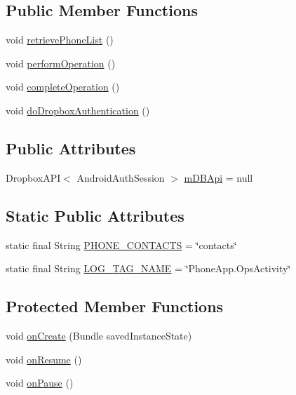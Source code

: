 \subsection*{Public Member Functions}
\begin{DoxyCompactItemize}
\item 
void \hyperlink{classcourse_1_1examples_1_1phoneapp_1_1_ops_activity_a4483070d81483a14c450c03a23521b33}{retrieve\+Phone\+List} ()
\item 
void \hyperlink{classcourse_1_1examples_1_1phoneapp_1_1_ops_activity_a427848e2c42eb538b888f8b7214b8cd4}{perform\+Operation} ()
\item 
void \hyperlink{classcourse_1_1examples_1_1phoneapp_1_1_ops_activity_abb7503626eea4caf6ffba416b13bd788}{complete\+Operation} ()
\item 
void \hyperlink{classcourse_1_1examples_1_1phoneapp_1_1_ops_activity_ae6f21dd987eba779e66e4bb66bbee391}{do\+Dropbox\+Authentication} ()
\end{DoxyCompactItemize}
\subsection*{Public Attributes}
\begin{DoxyCompactItemize}
\item 
Dropbox\+A\+P\+I$<$ Android\+Auth\+Session $>$ \hyperlink{classcourse_1_1examples_1_1phoneapp_1_1_ops_activity_afa9dcbfe8d531688656b8ee3042ccba6}{m\+D\+B\+Api} = null
\end{DoxyCompactItemize}
\subsection*{Static Public Attributes}
\begin{DoxyCompactItemize}
\item 
static final String \hyperlink{classcourse_1_1examples_1_1phoneapp_1_1_ops_activity_a6bbe27893d347a4f66c9bac0e2dcc80b}{P\+H\+O\+N\+E\+\_\+\+C\+O\+N\+T\+A\+C\+T\+S} = \char`\"{}contacts\char`\"{}
\item 
static final String \hyperlink{classcourse_1_1examples_1_1phoneapp_1_1_ops_activity_a00103d05c714f90b383b1a449576484a}{L\+O\+G\+\_\+\+T\+A\+G\+\_\+\+N\+A\+M\+E} = \char`\"{}Phone\+App.\+Ops\+Activity\char`\"{}
\end{DoxyCompactItemize}
\subsection*{Protected Member Functions}
\begin{DoxyCompactItemize}
\item 
void \hyperlink{classcourse_1_1examples_1_1phoneapp_1_1_ops_activity_a124a97ed5678d96f0888b55db9e283bb}{on\+Create} (Bundle saved\+Instance\+State)
\item 
void \hyperlink{classcourse_1_1examples_1_1phoneapp_1_1_ops_activity_aeb8480322291f8d86c1afd370f4d46e9}{on\+Resume} ()
\item 
void \hyperlink{classcourse_1_1examples_1_1phoneapp_1_1_ops_activity_ae68d43a22b46dd1dea9f23b8f48589aa}{on\+Pause} ()
\end{DoxyCompactItemize}


